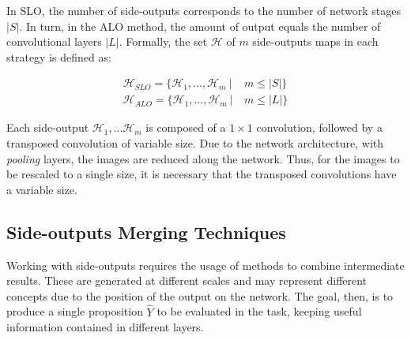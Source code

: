 % 

In SLO, the number of side-outputs corresponds to the number of network stages $|S|$.
In turn, in the ALO method, the amount of output equals the number of convolutional layers $|L|$.
Formally, the set $ \mathcal{H}$ of $m$ side-outputs maps in each strategy is defined as:

\begin{align}
\mathcal{H}_{SLO}=\{\mathcal{H}_1,...,\mathcal{H}_m~|&~ m \le |S|\}\\
\mathcal{H}_{ALO}=\{\mathcal{H}_1,...,\mathcal{H}_m~|&~ m \le |L|\}
\end{align}

Each side-output $\mathcal{H}_1, ... \mathcal{H}_m$ is composed of a $1 \times 1$ convolution, followed by a transposed convolution of variable size.
Due to the network architecture, with \textit{pooling} layers, the images are reduced along the network. 
Thus, for the images to be rescaled to a single size, it is necessary that the transposed convolutions have a variable size.

\subsection{Side-outputs Merging Techniques}
\label{cap5_func_combinar_saidas}

Working with side-outputs requires the usage of methods to combine intermediate results.
These are generated at different scales and may represent different concepts due to the position of the output on the network.
The goal, then, is to produce a single proposition $\hat{Y}$ to be evaluated in the task, keeping useful information contained in different layers.

